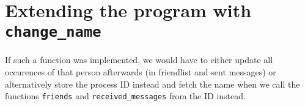 \documentclass[a4paper]{article}
\begin{document}
\section*{Extending the program with \texttt{change\_name}}
If such a function was implemented, we would have to either update all occurences of that person afterwards (in friendlist and sent messages) or alternatively store the process ID instead and fetch the name when we call the functions \texttt{friends} and \texttt{received\_messages} from the ID instead.
\end{document}
